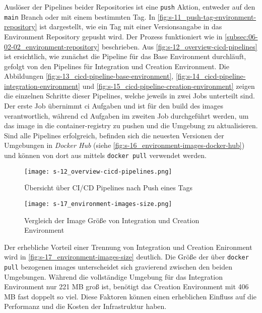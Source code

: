 Auslöser der Pipelines beider Repositories ist eine \texttt{push} Aktion, entweder auf den \texttt{main} Branch oder mit einem bestimmten Tag. In \autoref{fig:s-11_push-tag-environment-repository} ist dargestellt, wie ein Tag mit einer Versionsangabe in das Environment Repository gepusht wird. Der Prozess funktioniert wie in \autoref{subsec:06-02-02_environment-repository} beschrieben. Aus \autoref{fig:s-12_overview-cicd-pipelines} ist ersichtlich, wie zunächst die Pipeline für das Base Environment durchläuft, gefolgt von den Pipelines für Integration und Creation Environment. Die Abbildungen \ref{fig:s-13_cicd-pipeline-base-environment}, \ref{fig:s-14_cicd-pipeline-integration-environment} und \ref{fig:s-15_cicd-pipeline-creation-environment} zeigen die einzelnen Schritte dieser Pipelines, welche jeweils in zwei Jobs unterteilt sind. Der erste Job übernimmt \Gls{ci} Aufgaben und ist für den \Gls{build} des \Glspl{image} verantwortlich, während \Gls{cd} Aufgaben im zweiten Job durchgeführt werden, um das \Gls{image} in die \Gls{container-registry} zu pushen und die Umgebung zu aktualisieren. Sind alle Pipelines erfolgreich, befinden sich die neuesten Versionen der Umgebungen in \textit{Docker Hub} (siehe \autoref{fig:s-16_environment-images-docker-hub}) und können von dort aus mittels \texttt{docker pull} verwendet werden.

\begin{figure}[H]
    \centering
    \texttt{[image: s-12\_overview-cicd-pipelines.png]}
    \caption{Übersicht über CI/CD Pipelines nach Push eines Tags}
    \label{fig:s-12_overview-cicd-pipelines}
\end{figure}

\begin{figure}[H]
    \centering
    \texttt{[image: s-17\_environment-images-size.png]}
    \caption{Vergleich der Image Größe von Integration und Creation Environment}
    \label{fig:s-17_environment-images-size}
\end{figure}

Der erhebliche Vorteil einer Trennung von Integration und Creation Enironment wird in \autoref{fig:s-17_environment-images-size} deutlich. Die Größe der über \texttt{docker pull} bezogenen \Glspl{image} unterscheidet sich gravierend zwischen den beiden Umgebungen. Während die vollständige Umgebung für das Integration Environment nur 221 MB groß ist, benötigt das Creation Environment mit 406 MB fast doppelt so viel. Diese Faktoren können einen erheblichen Einfluss auf die Performanz und die Kosten der Infrastruktur haben.

